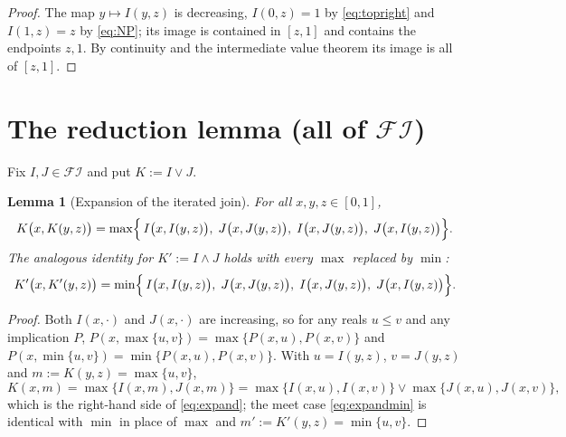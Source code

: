 \documentclass{amsart}
\theoremstyle{plain}
\newtheorem{lemma}{Lemma}
\theoremstyle{definition}
\newcommand{\FI}{\mathcal{FI}}
\begin{document}
\begin{proof}
The map $y\mapsto I(y,z)$ is decreasing, $I(0,z)=1$ by \eqref{eq:topright} and $I(1,z)=z$
by \eqref{eq:NP}; its image is contained in $[z,1]$ and contains the endpoints $z,1$. By
continuity and the intermediate value theorem its image is all of $[z,1]$.
\end{proof}

\section{The reduction lemma (all of $\FI$)}\label{sec:reduction}

Fix $I,J\in\FI$ and put $K:=I\vee J$.

\begin{lemma}[Expansion of the iterated join]\label{lem:identity}
For all $x,y,z\in[0,1]$,
\begin{equation}\label{eq:expand}
K\bigl(x,K(y,z)\bigr)=\max\Bigl\{\,I\bigl(x,I(y,z)\bigr),\;J\bigl(x,J(y,z)\bigr),\;
I\bigl(x,J(y,z)\bigr),\;J\bigl(x,I(y,z)\bigr)\Bigr\}.
\end{equation}
The analogous identity for $K':=I\wedge J$ holds with every $\max$ replaced by $\min$:
\begin{equation}\label{eq:expandmin}
K'\bigl(x,K'(y,z)\bigr)=\min\Bigl\{\,I\bigl(x,I(y,z)\bigr),\;J\bigl(x,J(y,z)\bigr),\;
I\bigl(x,J(y,z)\bigr),\;J\bigl(x,I(y,z)\bigr)\Bigr\}.
\end{equation}
\end{lemma}

\begin{proof}
Both $I(x,\cdot)$ and $J(x,\cdot)$ are increasing, so for any reals $u\le v$ and any
implication $P$, $P(x,\max\{u,v\})=\max\{P(x,u),P(x,v)\}$ and
$P(x,\min\{u,v\})=\min\{P(x,u),P(x,v)\}$. With $u=I(y,z)$, $v=J(y,z)$ and
$m:=K(y,z)=\max\{u,v\}$,
\[
K(x,m)=\max\{I(x,m),J(x,m)\}
      =\max\{I(x,u),I(x,v)\}\vee\max\{J(x,u),J(x,v)\},
\]
which is the right-hand side of \eqref{eq:expand}; the meet case
\eqref{eq:expandmin} is identical with $\min$ in place of $\max$ and
$m':=K'(y,z)=\min\{u,v\}$.
\end{proof}
\end{document}

